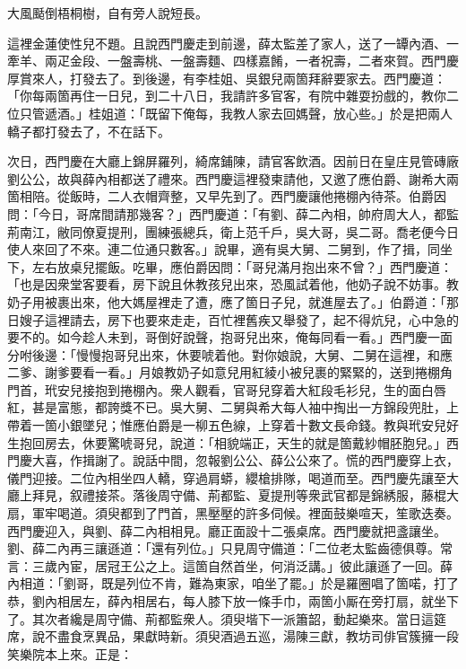 \begin{myquote}
大風颳倒梧桐樹，自有旁人說短長。
\end{myquote}

這裡金蓮使性兒不題。且說西門慶走到前邊，薛太監差了家人，送了一罈內酒、一牽羊、兩疋金段、一盤壽桃、一盤壽麵、四樣嘉餚，一者祝壽，二者來賀。西門慶厚賞來人，打發去了。到後邊，有李桂姐、吳銀兒兩箇拜辭要家去。西門慶道：「你每兩箇再住一日兒，到二十八日，我請許多官客，有院中雜耍扮戲的，教你二位只管遞酒。」桂姐道：「既留下俺每，我教人家去回媽聲，放心些。」於是把兩人轎子都打發去了，不在話下。

次日，西門慶在大廳上錦屏羅列，綺席鋪陳，請官客飲酒。因前日在皇庄見管磚廠劉公公，故與薛內相都送了禮來。西門慶這裡發柬請他，又邀了應伯爵、謝希大兩箇相陪。從飯時，二人衣帽齊整，又早先到了。西門慶讓他捲棚內待茶。伯爵因問：「今日，哥席間請那幾客？」西門慶道：「有劉、薛二內相，帥府周大人，都監荊南江，敝同僚夏提刑，團練張總兵，衛上范千戶，吳大哥，吳二哥。喬老便今日使人來回了不來。連二位通只數客。」說畢，適有吳大舅、二舅到，作了揖，同坐下，左右放桌兒擺飯。吃畢，應伯爵因問：「哥兒滿月抱出來不曾？」西門慶道：「也是因衆堂客要看，房下說且休教孩兒出來，恐風試着他，他奶子說不妨事。教奶子用被裹出來，他大媽屋裡走了遭，應了箇日子兒，就進屋去了。」伯爵道：「那日嫂子這裡請去，房下也要來走走，百忙裡舊疾又舉發了，起不得炕兒，心中急的要不的。如今趁人未到，哥倒好說聲，抱哥兒出來，俺每同看一看。」西門慶一面分咐後邊：「慢慢抱哥兒出來，休要唬着他。對你娘說，大舅、二舅在這裡，和應二爹、謝爹要看一看。」月娘教奶子如意兒用紅綾小被兒裹的緊緊的，送到捲棚角門首，玳安兒接抱到捲棚內。衆人觀看，官哥兒穿着大紅段毛衫兒，生的面白唇紅，甚是富態，都誇獎不已。吳大舅、二舅與希大每人袖中掏出一方錦段兜肚，上帶着一箇小銀墜兒；惟應伯爵是一柳五色線，上穿着十數文長命錢。教與玳安兒好生抱回房去，休要驚唬哥兒，說道：「相貌端正，天生的就是箇戴紗帽胚胞兒。」{}西門慶大喜，作揖謝了。說話中間，忽報劉公公、薛公公來了。慌的西門慶穿上衣，儀門迎接。二位內相坐四人轎，穿過肩蟒，纓槍排隊，喝道而至。西門慶先讓至大廳上拜見，叙禮接茶。落後周守備、荊都監、夏提刑等衆武官都是錦綉服，藤棍大扇，軍牢喝道。須臾都到了門首，黑壓壓的許多伺候。裡面鼓樂喧天，笙歌迭奏。西門慶迎入，與劉、薛二內相相見。廳正面設十二張桌席。西門慶就把盞讓坐。劉、薛二內再三讓遜道：「還有列位。」只見周守備道：「二位老太監齒德俱尊。常言：三歲內宦，居冠王公之上。這箇自然首坐，何消泛講。」彼此讓遜了一回。薛內相道：「劉哥，既是列位不肯，難為東家，咱坐了罷。」於是羅圈唱了箇喏，打了恭，劉內相居左，薛內相居右，每人膝下放一條手巾，兩箇小厮在旁打扇，就坐下了。其次者纔是周守備、荊都監衆人。須臾堦下一派簫韶，動起樂來。當日這筵席，說不盡食烹異品，果獻時新。須臾酒過五巡，湯陳三獻，教坊司俳官簇擁一段笑樂院本上來。正是：

